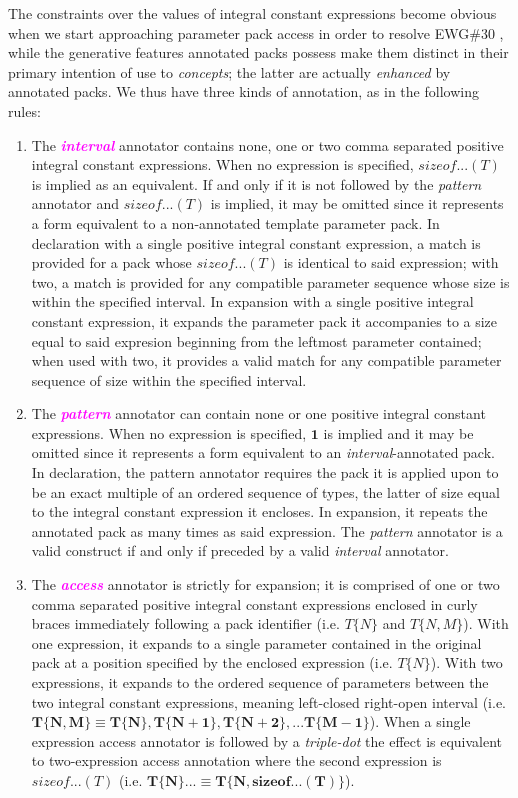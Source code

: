\p The constraints over the values of integral constant expressions become obvious when we start approaching parameter pack access in order to resolve EWG\#30 \cite{Abrahams2012}, while the generative features annotated packs possess make them distinct in their primary intention of use to \textit{concepts}; the latter are actually \textit{enhanced} by annotated packs.
We thus have three kinds of annotation, as in the following rules:
\begin{enumerate}
\item\p The \textcolor{Magenta}{\textbf{\textit{interval}}} annotator contains none, one or two comma separated positive integral constant expressions.
When no expression is specified, $sizeof...(T)$ is implied as an equivalent.
If and only if it is not followed by the \textit{pattern} annotator and $sizeof...(T)$ is implied, it may be omitted since it represents a form equivalent to a non-annotated template parameter pack.
In declaration with a single positive integral constant expression, a match is provided for a pack whose $sizeof...(T)$ is identical to said expression; with two, a match is provided for any compatible parameter sequence whose size is within the specified interval.
In expansion with a single positive integral constant expression, it expands the parameter pack it accompanies to a size equal to said expresion beginning from the leftmost parameter contained;
when used with two, it provides a valid match for any compatible parameter sequence of size within the specified interval.

\item\p The \textcolor{Magenta}{\textbf{\textit{pattern}}} annotator can contain none or one positive integral constant expressions.
When no expression is specified, $\bm{1}$ is implied and it may be omitted since it represents a form equivalent to an \textit{interval}-annotated pack.
In declaration, the pattern annotator requires the pack it is applied upon to be an exact multiple of an ordered sequence of types, the latter of size equal to the integral constant expression it encloses. In expansion, it repeats the annotated pack as many times as said expression.
The \textit{pattern} annotator is a valid construct if and only if preceded by a valid \textit{interval} annotator.

\item\p The \textcolor{Magenta}{\textbf{\textit{access}}} annotator is strictly for expansion; it is comprised of one or two comma separated positive integral constant expressions enclosed in curly braces immediately following a pack identifier (i.e. $T\{N\}$ and $T\{N,M\}$).
With one expression, it expands to a single parameter contained in the original pack at a position specified by the enclosed expression (i.e. $T\{N\}$).
With two expressions, it expands to the ordered sequence of parameters between the two integral constant expressions, meaning left-closed right-open interval (i.e. $\bm{T\{N,M\} \equiv T\{N\},T\{N+1\},T\{N+2\},...T\{M-1\}}$).
When a single expression access annotator is followed by a \textit{triple-dot} the effect is equivalent to two-expression access annotation where the second expression is $sizeof...(T)$ (i.e. $\bm{T\{N\}... \equiv T\{N,sizeof...(T)\}}$).
\end{enumerate}

